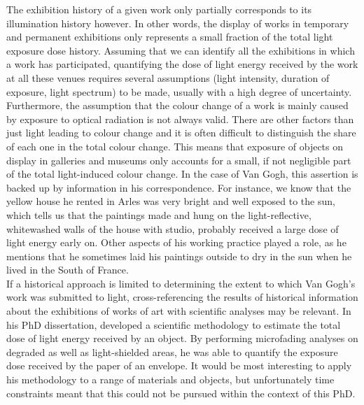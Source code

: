 \newpage

The exhibition history of a given work only partially corresponds to its illumination history however. In other words, the display of works in temporary and permanent exhibitions only represents a small fraction of the total light exposure dose history. Assuming that we can identify all the exhibitions in which a work has participated, quantifying the dose of light energy received by the work at all these venues requires several assumptions (light intensity, duration of exposure, light spectrum) to be made, usually with a high degree of uncertainty. Furthermore, the assumption that the colour change of a work is mainly caused by exposure to optical radiation is not always valid. There are other factors than just light  leading to colour change and it is often difficult to distinguish the share of each one in the total colour change. This means that exposure of objects on display in galleries and museums only accounts for a small, if not negligible part of the total light-induced colour change. In the case of Van Gogh, this assertion is backed up by information in his correspondence. For instance, we know that the yellow house he rented in Arles was very bright and well exposed to the sun, which tells us that the paintings made and hung on the light-reflective, whitewashed walls of the house with studio, probably received a large dose of light energy early on. Other aspects of his working practice played a role, as he mentions that he sometimes laid his paintings outside to dry in the sun when he lived in the South of France.\\

If a historical approach is limited to determining the extent to which Van Gogh’s work was submitted to light, cross-referencing the results of historical information about the exhibitions of works of art with scientific analyses may be relevant. In his PhD dissertation, \citet[318–25]{del_hoyo-melendez_study_2010} developed a scientific methodology to estimate the total dose of light energy received by an object. By performing microfading analyses on degraded as well as light-shielded areas, he was able to quantify the exposure dose received by the paper of an envelope. It would be most interesting to apply his methodology to a range of materials and objects, but unfortunately time constraints meant that this could not be pursued within the context of this PhD.\\


